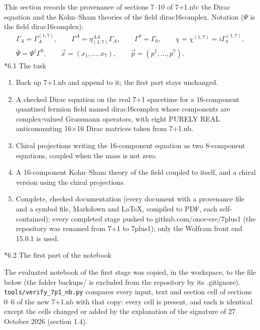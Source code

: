 \documentclass[10pt,a4paper]{article}
\makeatletter
\renewcommand\subsection{\@startsection{subsection}{2}{\z@}{-3.25ex\@plus -1ex \@minus -.2ex}{1.5ex \@plus .2ex}{\normalfont\large\bfseries\raggedright}}
\makeatother
\begin{document}
This section records the provenance of sections 7–10 of 7+1.nb: the Dirac equation and the Kohn–Sham theories of the field dirac16complex. Notation ($\Psi$ is the field dirac16complex):
\begin{gather*}
\Gamma_A=\Gamma^{(1,7)}_A,\qquad \Gamma^{A}=\eta_{(1,7)}^{AA}\Gamma_A,\qquad \Gamma^0=\Gamma_0,\qquad \chi=\chi^{(1,7)}=i\Gamma^{(1,7)}_8,\\ \bar\Psi=\Psi^\dagger\Gamma^0,\qquad \vec x=(x_1,\dots,x_7),\qquad \vec p=(p^1,\dots,p^7).
\end{gather*}
\subsection*{6.1 The task}
\begin{enumerate}
\item Back up 7+1.nb and append to it; the first part stays unchanged.
\item A checked Dirac equation on the real 7+1 spacetime for a 16-component quantized fermion field named dirac16complex whose components are complex-valued Grassmann operators, with eight PURELY REAL anticommuting 16×16 Dirac matrices taken from 7+1.nb.
\item Chiral projections writing the 16-component equation as two 8-component equations, coupled when the mass is not zero.
\item A 16-component Kohn–Sham theory of the field coupled to itself, and a chiral version using the chiral projections.
\item Complete, checked documentation (every document with a provenance file and a symbol file, Markdown and LaTeX, compiled to PDF, each self-contained); every completed stage pushed to github.com/once-ere/7plus1 (the repository was renamed from 7+1 to 7plus1); only the Wolfram front end 15.0.1 is used.
\end{enumerate}
\subsection*{6.2 The first part of the notebook}
The evaluated notebook of the first stage was copied, in the workspace, to the file below (the folder backups/ is excluded from the repository by its .gitignore). \texttt{tools/\allowbreak{}verify\_\allowbreak{}7p1\_\allowbreak{}nb.py} compares every input, text and section cell of sections 0–6 of the new 7+1.nb with that copy: every cell is present, and each is identical except the cells changed or added by the explanation of the signature of 27 October 2026 (section 1.4).
\end{document}
